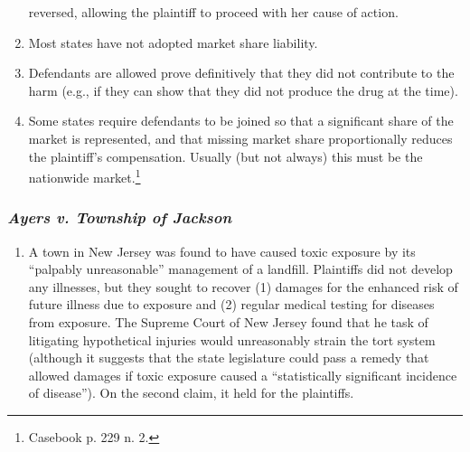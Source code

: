 \begin{enumerate}
    reversed, allowing the plaintiff to proceed with her cause of action.
    \item Most states have not adopted market share liability.
    \item Defendants are allowed prove definitively that they did not 
    contribute to the harm (e.g., if they can show that they did not produce 
    the drug at the time).
    \item Some states require defendants to be joined so that a significant 
    share of the market is represented, and that missing market share 
    proportionally reduces the plaintiff's compensation. Usually (but not 
    always) this must be the nationwide market.\footnote{Casebook p. 229 n. 
    2.}
\end{enumerate}

\subsubsection{\emph{Ayers v. Township of Jackson}}

\begin{enumerate}
    \item A town in New Jersey was found to have caused toxic exposure by its 
    ``palpably unreasonable'' management of a landfill. Plaintiffs did not 
    develop any illnesses, but they sought to recover (1) damages for the 
    enhanced risk of future illness due to exposure and (2) regular medical 
    testing for diseases from exposure. The Supreme Court of New Jersey found 
    that he task of litigating hypothetical injuries would unreasonably strain 
    the tort system (although it suggests that the state legislature could 
    pass a remedy that allowed damages if toxic exposure caused a 
    ``statistically significant incidence of disease''). On the second claim, 
    it held for the plaintiffs.
\end{enumerate}

